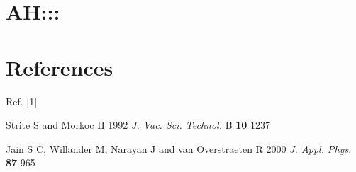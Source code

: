 \documentclass[a4paper]{jpconf}
\begin{document}
\ack %


\appendix %
\section{AH:::}




\section*{References}



Ref. [1]

\begin{thebibliography}{9}
\item Strite S and Morkoc H 1992 {\it J. Vac. Sci. Technol.} B {\bf 10} 1237 
\item Jain S C, Willander M, Narayan J and van Overstraeten R 2000 
{\it J. Appl. Phys}. {\bf 87} 965 
\end{thebibliography}
\end{document}

